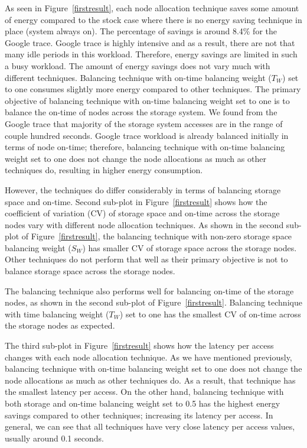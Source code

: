 \documentclass[preprint,12pt]{elsarticle}
\begin{document}
As seen in Figure~\ref{firstresult}, each node allocation technique saves some amount of energy
compared to the stock case where there is no energy saving technique in place (system always on).
The percentage of savings is around 8.4\% for the Google trace. Google trace is highly intensive and as a
result, there are not that many idle periods in this workload. Therefore, energy savings are limited in
such a busy workload.
The amount of energy savings does not
vary much with different techniques. Balancing technique with on-time balancing weight ($T_W$) set to
one consumes slightly more energy compared to other techniques. The primary objective of balancing technique
with on-time balancing weight set to one is to balance the on-time of nodes across the storage system. We found
from the Google trace that majority of the storage system accesses are in the range of couple hundred seconds.
Google trace workload is already balanced initially in terms of node on-time; therefore, balancing technique
with on-time balancing weight set to one does not change the node allocations as much as other techniques do,
resulting in higher energy consumption.

However, the techniques do differ considerably in terms of balancing storage space and on-time. Second sub-plot in
Figure~\ref{firstresult} shows how the coefficient of variation (CV) of storage space and on-time across the storage nodes
vary with different node allocation techniques. As shown in the second sub-plot of Figure~\ref{firstresult}, the
balancing technique with non-zero storage space balancing weight ($S_W$) has smaller CV
of storage space across the storage nodes. Other techniques do not perform that well as their primary objective
is not to balance storage space across the storage nodes.

The balancing technique also performs well for balancing on-time of the storage nodes, as shown in the second sub-plot
of Figure~\ref{firstresult}. Balancing technique with time balancing weight ($T_W$) set to one has the smallest CV
of on-time across the storage nodes as expected.

The third sub-plot in Figure~\ref{firstresult} shows how the latency per access changes with each node allocation technique.
As we have mentioned previously, balancing technique with on-time balancing weight set to one does not change the node
allocations as much as other techniques do. As a result, that technique has the smallest latency per access. On the
other hand, balancing technique with both storage and on-time balancing weight set to 0.5 has the highest energy savings
compared to other techniques; increasing its latency per access. In general, we can see that all techniques have very
close latency per access values, usually around 0.1 seconds. 
\end{document}
